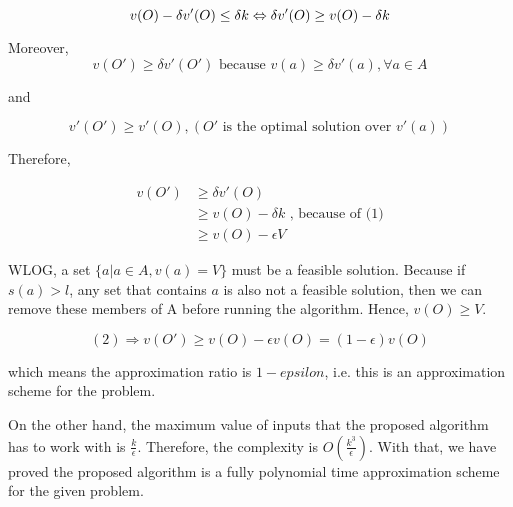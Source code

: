 \documentclass{article}
\begin{document}
\begin{equation}
    v(O)-\delta v'(O)\le \delta k \\
    \Leftrightarrow \delta v'(O)\ge v(O)- \delta k
\end{equation}

Moreover, 
$$v(O')\ge \delta v'(O') \text{ because } v(a)\ge \delta v'(a),\forall a\in A$$

and

$$v'(O')\ge v'(O), (O' \text{ is the optimal solution over } v'(a))$$

Therefore,


\begin{equation}
\begin{aligned}
v(O')&\ge \delta v'(O) \\
    &\ge v(O) - \delta k \text{ , because of (1)} \\
    &\ge v(O) - \epsilon V
\end{aligned}
\end{equation}

WLOG, a set $\{a|a\in A,v(a)=V\}$ must be a feasible solution. Because if $s(a)>l$, any set that contains $a$ is also not a feasible solution, then we can remove these members of A before running the algorithm. Hence, $v(O)\ge V$.

$$(2) \Rightarrow v(O')\ge v(O)-\epsilon v(O) = (1-\epsilon)v(O)$$

which means the approximation ratio is $1-epsilon$, i.e. this is an approximation scheme for the problem.

On the other hand, the maximum value of inputs that the proposed algorithm has to work with is $\frac{k}{\epsilon}$. Therefore, the complexity is $O\left ( \frac{k^3}{\epsilon}\right )$. With that, we have proved the proposed algorithm is a fully polynomial time approximation scheme for the given problem.
\end{document}
